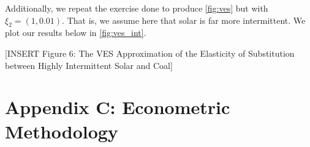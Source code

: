 \documentclass[11pt,a4paper,leqno]{extarticle}
\begin{document}
	
	Additionally, we repeat the exercise done to produce \autoref{fig:ves} but with $\xi_2 = (1, 0.01)$. That is, we assume here that solar is far more intermittent. We plot our results below in 	\autoref{fig:ves_int}.
	
	
	\vspace{0.15in}
	\begin{center}
		[INSERT Figure 6: The VES Approximation of the Elasticity of Substitution between Highly Intermittent Solar and Coal]
	\end{center}
	\vspace{0.15in}
	
	
	\pagebreak
	
	\section{Appendix C: Econometric Methodology}
	\label{sec:AppendixC}
	
\end{document}
